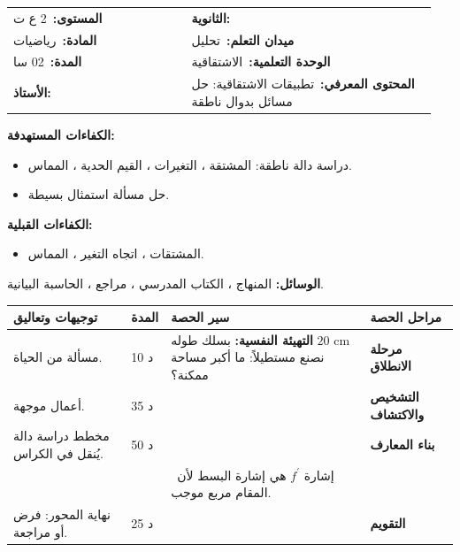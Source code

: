 \documentclass[12pt,a4paper]{article}
\makeatletter
\newenvironment{LTR}{\begin{otherlanguage}{english}}{\end{otherlanguage}}
\newcommand{\ar}[1]{\foreignlanguage{arabic}{#1}}
\newcommand{\Phase}[1]{\textbf{#1}}
\newcommand{\Fld}[2]{\textbf{#1:}\ #2}
\newcommand{\ModhHead}[9]{%
\begin{LTR}
\begin{tcolorbox}[enhanced,colback=white,colframe=cThm!85!black,arc=4mm,boxrule=1pt,top=14pt,bottom=6pt,left=8pt,right=8pt,
 overlay={\node[fill=cThm!85!black,text=white,rounded corners=3mm,inner xsep=14pt,inner ysep=4pt,font=\large\bfseries] at ([yshift=0pt]frame.north){\ar{مذكرة رقم #1}};},
 before upper={\selectlanguage{arabic}}]
\begin{tabular}{@{}p{0.4\linewidth}p{0.55\linewidth}@{}}
\Fld{المستوى}{#2} & \Fld{الثانوية}{\dotfill}\\[3pt]
\Fld{المادة}{رياضيات} & \Fld{ميدان التعلم}{#3}\\[3pt]
\Fld{المدة}{#5} & \Fld{الوحدة التعلمية}{#4}\\[3pt]
\Fld{الأستاذ}{\dotfill} & \Fld{المحتوى المعرفي}{#6}\\
\end{tabular}
\end{tcolorbox}
\begin{tcolorbox}[enhanced,colback=white,colframe=cThm!85!black,arc=3mm,boxrule=0.8pt,sidebyside,sidebyside align=top,lefthand ratio=0.5,
 segmentation style={dashed,cThm!60},before upper={\selectlanguage{arabic}},before lower={\selectlanguage{arabic}}]
\textbf{الكفاءات المستهدفة:}\par #8
\tcblower
\textbf{الكفاءات القبلية:}\par #7
\end{tcolorbox}
\end{LTR}
\par\smallskip\textbf{الوسائل:} #9\par\smallskip}
\newenvironment{Sayr}{%
\begin{LTR}\renewcommand{\arraystretch}{1.25}
\begin{longtable}{|p{0.17\textwidth}|>{\centering\arraybackslash}p{0.06\textwidth}|p{0.53\textwidth}|>{\centering\arraybackslash}p{0.12\textwidth}|}
\hline\rowcolor{cThm!12}\ar{\textbf{توجيهات وتعاليق}} & \ar{\textbf{المدة}} & \ar{\textbf{سير الحصة}} & \ar{\textbf{مراحل الحصة}}\\\hline\endhead
\hline\endfoot}{\end{longtable}\end{LTR}}
\newcommand{\Row}[4]{\ar{\small #4} & \ar{#3} & \ar{#2} & \cellcolor{cThm!8}\ar{\Phase{#1}}\\\hline}
\newcommand{\Lab}[2]{\foreignlanguage{english}{\tcbox[on line,colback=#1,colframe=#1,boxrule=0pt,arc=2pt,boxsep=1pt,left=5pt,right=5pt,top=1pt,bottom=1pt]{\ar{\textcolor{white}{\textbf{#2}}}}}}
\newcommand{\ck}{\ensuremath{{\color{cRem}\checkmark}}}
\makeatother
\begin{document}
\newpage
\ModhHead{17}{2 ع ت}{تحليل}{الاشتقاقية}{02 سا}{تطبيقات الاشتقاقية: حل مسائل بدوال ناطقة}%
{\begin{itemize}\item المشتقات ، اتجاه التغير ، المماس.\end{itemize}}%
{\begin{itemize}\item دراسة دالة ناطقة: المشتقة ، التغيرات ، القيم الحدية ، المماس.\item حل مسألة استمثال بسيطة.\end{itemize}}%
{المنهاج ، الكتاب المدرسي ، مراجع ، الحاسبة البيانية.}
\begin{Sayr}
\Row{مرحلة الانطلاق}{%
\textbf{التهيئة النفسية:} بسلك طوله $20$ cm نصنع مستطيلاً: ما أكبر مساحة ممكنة؟}{10 د}{مسألة من الحياة.}
\Row{التشخيص والاكتشاف}{%
\Lab{cEx}{مناقشة أعمال موجهة صفحة 98}\par\ck\ ترييض المسألة بدالة ، ثم دراسة تغيراتها بالمشتقة.\par
\ck\ المستطيل بعداه $x$ و $10-x$: $A(x)=x(10-x)$ ، $A^{\prime}(x)=10-2x$ ؛ أكبر مساحة $A(5)=25$ cm$^2$ (مربع).\par
}{35 د}{أعمال موجهة.}
\Row{بناء المعارف}{%
\Lab{cMeth}{دراسة دالة ناطقة}\ مجموعة التعريف ، المشتقة ، إشارتها ، جدول التغيرات ، القيم الحدية ، ثم المماسات.\par\Lab{cEx}{مثال}\ $f(x)=\dfrac{x^2+3}{x-1}$ على $\mathbb R-\{1\}$:\par\ck\ $f^{\prime}(x)=\dfrac{2x(x-1)-(x^2+3)}{(x-1)^2}=\dfrac{x^2-2x-3}{(x-1)^2}=\dfrac{(x-3)(x+1)}{(x-1)^2}$.\par
\ck\ $f$ متزايدة على $]-\infty;-1]$ وعلى $[3;+\infty[$ ، ومتناقصة على $[-1;1[$ وعلى $]1;3]$.\par
\ck\ عظمى محلية $f(-1)=-2$ ، صغرى محلية $f(3)=6$.\par
\ck\ المماس عند $0$: $f(0)=-3$ ، $f^{\prime}(0)=-3$: $y=-3x-3$.\par
}{50 د}{مخطط دراسة دالة يُنقل في الكراس.}
\Row{}{%
\Lab{cThm!80!black}{حذار}\ إشارة $f^{\prime}$ هي إشارة البسط لأن المقام مربع موجب.}{}{}
\Row{التقويم}{%
\Lab{cEx}{تطبيق}\par ادرس اتجاه تغير $f(x)=\dfrac{2x-1}{x+1}$ على $]-1;+\infty[$.\par\textbf{الحل:} $f^{\prime}(x)=\dfrac{2(x+1)-(2x-1)}{(x+1)^2}=\dfrac3{(x+1)^2}>0$ ، إذن $f$ متزايدة تماماً على $]-1;+\infty[$.\par\textbf{واجب منزلي:} تمارين 40 إلى 43 صفحة 106 ، ومسائل صفحتي 106 و 107.\par\smallskip\textbf{ملاحظات حول سير الحصة:} \dotfill}{25 د}{نهاية المحور: فرض أو مراجعة.}
\end{Sayr}
\end{document}
